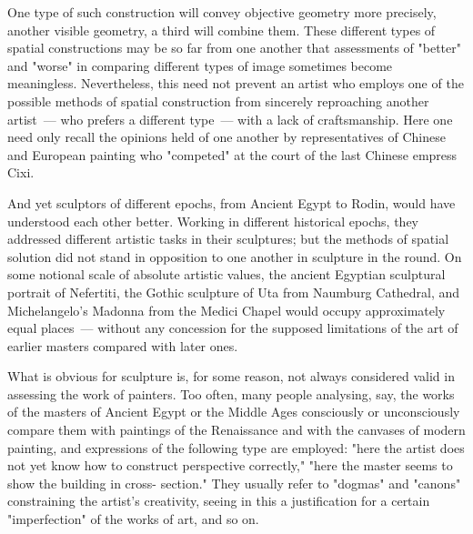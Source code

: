 
One type of such construction will convey objective geometry more precisely, another
visible geometry, a third will combine them. These different types of spatial constructions
may be so far from one another that assessments of "better" and "worse" in comparing
different types of image sometimes become meaningless. Nevertheless, this need not
prevent an artist who employs one of the possible methods of spatial construction from
sincerely reproaching another artist~--- who prefers a different type~--- with a lack of
craftsmanship. Here one need only recall the opinions held of one another by
representatives of Chinese and European painting who "competed" at the court of the
last Chinese empress Cixi.

And yet sculptors of different epochs, from Ancient Egypt to Rodin, would have
understood each other better. Working in different historical epochs, they addressed
different artistic tasks in their sculptures; but the methods of spatial solution did not
stand in opposition to one another in sculpture in the round. On some notional scale of
absolute artistic values, the ancient Egyptian sculptural portrait of Nefertiti, the Gothic
sculpture of Uta from Naumburg Cathedral, and Michelangelo's Madonna from the
Medici Chapel would occupy approximately equal places~--- without any concession for
the supposed limitations of the art of earlier masters compared with later ones.

What is obvious for sculpture is, for some reason, not always considered valid in
assessing the work of painters. Too often, many people analysing, say, the works of the
masters of Ancient Egypt or the Middle Ages consciously or unconsciously compare them
with paintings of the Renaissance and with the canvases of modern painting, and
expressions of the following type are employed: "here the artist does not yet know how
to construct perspective correctly," "here the master seems to show the building in cross-
section." They usually refer to "dogmas" and "canons" constraining the artist's creativity,
seeing in this a justification for a certain "imperfection" of the works of art, and so on.

